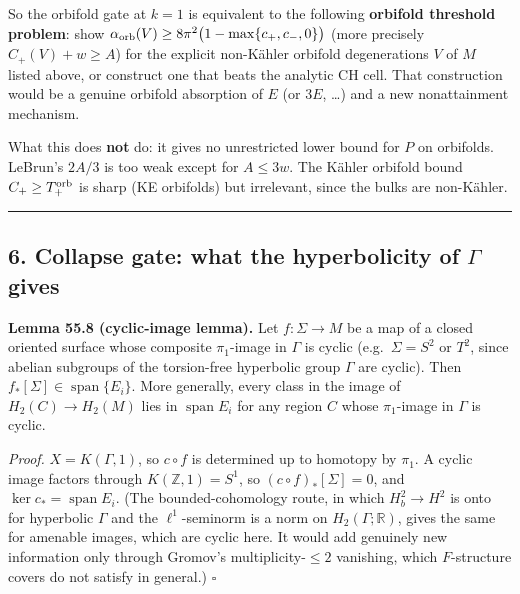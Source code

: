 \documentclass[
  10pt,
]{report}
\begin{document}
So the orbifold gate at \(k=1\) is equivalent to the following
\textbf{orbifold threshold problem}: show
\(\alpha_{\rm orb}(V)\ge8\pi^2\bigl(1-\max\{c_+,c_-,0\}\bigr)\) (more
precisely \(C_+(V)+w\ge A\)) for the explicit non-Kähler orbifold
degenerations \(V\) of \(M\) listed above, or construct one that beats
the analytic CH cell. That construction would be a genuine orbifold
absorption of \(E\) (or \(3E\), \ldots) and a new nonattainment
mechanism.

What this does \textbf{not} do: it gives no unrestricted lower bound for
\(P\) on orbifolds. LeBrun's \(2A/3\) is too weak except for \(A\le3w\).
The Kähler orbifold bound \(C_+\ge T_+^{\rm orb}\) is sharp (KE
orbifolds) but irrelevant, since the bulks are non-Kähler.

\begin{center}\rule{0.5\linewidth}{0.5pt}\end{center}

\hypertarget{collapse-gate-what-the-hyperbolicity-of-gamma-gives}{%
\subsection{\texorpdfstring{6. Collapse gate: what the hyperbolicity of
\(\Gamma\)
gives}{6. Collapse gate: what the hyperbolicity of \textbackslash Gamma gives}}\label{collapse-gate-what-the-hyperbolicity-of-gamma-gives}}

\textbf{Lemma 55.8 (cyclic-image lemma).} Let \(f:\Sigma\to M\) be a map
of a closed oriented surface whose composite \(\pi_1\)-image in
\(\Gamma\) is cyclic (e.g.~\(\Sigma=S^2\) or \(T^2\), since abelian
subgroups of the torsion-free hyperbolic group \(\Gamma\) are cyclic).
Then \(f_*[\Sigma]\in\operatorname{span}\{E_i\}\). More generally, every
class in the image of \(H_2(C)\to H_2(M)\) lies in
\(\operatorname{span}E_i\) for any region \(C\) whose \(\pi_1\)-image in
\(\Gamma\) is cyclic.

\emph{Proof.} \(X=K(\Gamma,1)\), so \(c\circ f\) is determined up to
homotopy by \(\pi_1\). A cyclic image factors through
\(K(\mathbb Z,1)=S^1\), so \((c\circ f)_*[\Sigma]=0\), and
\(\ker c_*=\operatorname{span}E_i\). (The bounded-cohomology route, in
which \(H^2_b\to H^2\) is onto for hyperbolic \(\Gamma\) and the
\(\ell^1\)-seminorm is a norm on \(H_2(\Gamma;\mathbb R)\), gives the
same for amenable images, which are cyclic here. It would add genuinely
new information only through Gromov's multiplicity-\(\le2\) vanishing,
which \(F\)-structure covers do not satisfy in general.) \(\square\)
\end{document}
